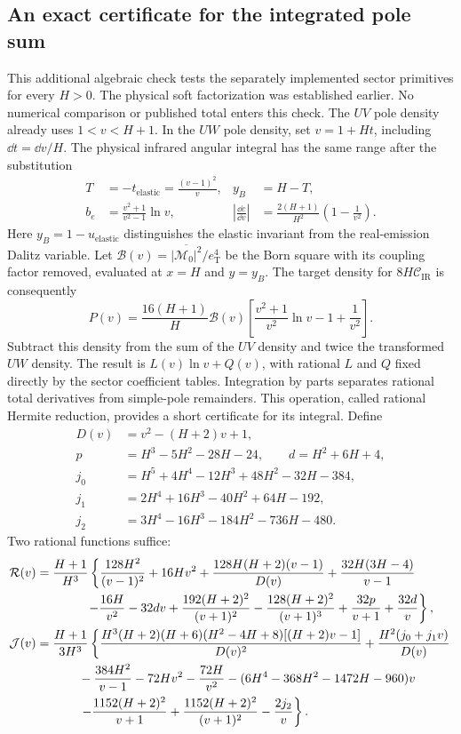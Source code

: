 \subsection{An exact certificate for the integrated pole sum}
This additional algebraic check tests the separately implemented sector
primitives for every $H>0$.  The physical soft factorization was established
earlier.  No numerical comparison or published total enters this check.
The $UV$ pole density already uses $1<v<H+1$.  In the $UW$ pole density,
set $v=1+Ht$, including $\dd t=\dd v/H$.  The physical infrared angular
integral has the same range after the substitution
\begin{align}
 T&=-t_{\mathrm{elastic}}=\frac{(v-1)^2}{v},
 &y_B&=H-T,\\
 b_e&=\frac{v^2+1}{v^2-1}\ln v,
 &\left|\frac{\dd c}{\dd v}\right|
 &=\frac{2(H+1)}{H^2}\left(1-\frac1{v^2}\right).
\end{align}
Here $y_B=1-u_{\mathrm{elastic}}$ distinguishes the elastic invariant
from the real-emission Dalitz variable. Let
$\mathcal B(v)=\overline{|\mathcal M_0|^2}/e_{\mathrm T}^4$ be the
Born square with its coupling factor removed, evaluated at $x=H$ and
$y=y_B$. The target density for $8H\mathcal C_{\mathrm{IR}}$
is consequently
\begin{equation}
 P(v)=\frac{16(H+1)}H\mathcal B(v)
 \left[\frac{v^2+1}{v^2}\ln v-1+\frac1{v^2}\right].
\end{equation}
Subtract this density from the sum of the $UV$ density and twice the
transformed $UW$ density.  The result is $L(v)\ln v+Q(v)$, with rational
$L$ and $Q$ fixed directly by the sector coefficient tables.  Integration by parts separates rational total derivatives from
simple-pole remainders. This operation, called rational Hermite reduction,
provides a short certificate for its integral.
Define
\begin{align}
 D(v)&=v^2-(H+2)v+1,\\
 p&=H^3-5H^2-28H-24,\qquad d=H^2+6H+4,\\
 j_0&=H^5+4H^4-12H^3+48H^2-32H-384,\\
 j_1&=2H^4+16H^3-40H^2+64H-192,\\
 j_2&=3H^4-16H^3-184H^2-736H-480.
\end{align}
Two rational functions suffice:
\begin{align}
 \mathcal R(v)&=\frac{H+1}{H^3}\left\{
 \frac{128H^2}{(v-1)^2}+16Hv^2
 +\frac{128H(H+2)(v-1)}{D(v)}
 +\frac{32H(3H-4)}{v-1}\right.\\
 &\hspace{14mm}\left.
 -\frac{16H}{v^2}-32dv
 +\frac{192(H+2)^2}{(v+1)^2}
 -\frac{128(H+2)^2}{(v+1)^3}
 +\frac{32p}{v+1}+\frac{32d}{v}\right\},\\
 \mathcal J(v)&=\frac{H+1}{3H^3}\left\{
 \frac{H^3(H+2)(H+6)(H^2-4H+8)[(H+2)v-1]}{D(v)^2}
 +\frac{H^2(j_0+j_1v)}{D(v)}\right.\\
 &\hspace{12mm}
 -\frac{384H^2}{v-1}-72Hv^2-\frac{72H}{v^2}
 -(6H^4-368H^2-1472H-960)v\\
 &\hspace{12mm}\left.
 -\frac{1152(H+2)^2}{v+1}
 +\frac{1152(H+2)^2}{(v+1)^2}-\frac{2j_2}{v}\right\}.
\end{align}
